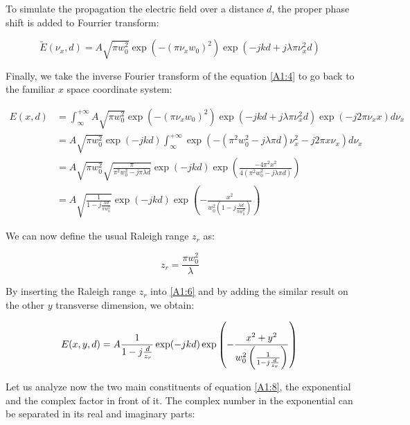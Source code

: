 To simulate the propagation the electric field over a distance $d$, the proper phase shift is added to Fourrier transform:

\begin{equation}
    \widetilde{E}(\nu_x,d) = A \sqrt{\pi w_0^2} \exp\left(-(\pi \nu_x w_0)^2 \right) \exp(-jkd +j \lambda \pi \nu_x^2 d)
\label{A1:4}
\end{equation}

Finally, we take the inverse Fourier transform of the equation \ref{A1:4} to go back to the familiar $x$ space coordinate system:

\begin{equation}
\begin{split}
   E(x,d) & = \int^{+\infty}_{\infty} A \sqrt{\pi w_0^2} \exp\left(-(\pi \nu_x w_0)^2 \right) \exp(-jkd +j \lambda \pi \nu_x^2 d) \exp(-j 2 \pi \nu_x x) d \nu_x  \\
   & = A \sqrt{\pi w_0^2} \exp(-jkd) \int^{+\infty}_{\infty} \exp \left( -(\pi^2 w_0^2 - j \lambda \pi d)\nu_x^2 -j 2 \pi x  \nu_x  \right) d \nu_x \\
   & = A  \sqrt{\pi w_0^2} \sqrt{\frac{\pi}{\pi^2 w_0^2 - j \pi \lambda d}}\exp(-jkd) \exp \left(\frac{-4 \pi^2 x^2}{4 (\pi^2 w_0^2 - j \lambda \pi d )} \right)\\
   & = A \sqrt{\frac{1}{1 - j \frac{\lambda d}{\pi w_0^2}}} \exp(-jkd) \exp\left(-\frac{x^2}{w_0^2 \left(1 -j \frac{\lambda d}{\pi w_0^2}\right)}\right)
\label{A1:6}
\end{split}
\end{equation}

We can now define the usual Raleigh range $z_r$ as:

\begin{equation}
    z_r = \frac{\pi w_0^2}{\lambda}
\label{A1:7}
\end{equation}

By inserting the Raleigh range $z_r$ into \ref{A1:6} and by adding the similar result on the other $y$ transverse dimension, we obtain:

\begin{equation}
   E(x,y,d) = A \frac{1}{1 - j \frac{d}{z_r}} \exp(-jkd) \exp\left(- \frac{x^2 +  y^2}{w_0^2 \left(\frac{1}{1 - j \frac{d}{z_r}} \right) } \right)\\
\label{A1:8}
\end{equation}

Let us analyze now the two main constituents of equation \ref{A1:8}, the exponential and the complex factor in front of it. The complex number in the exponential can be separated in its real and imaginary parts:

